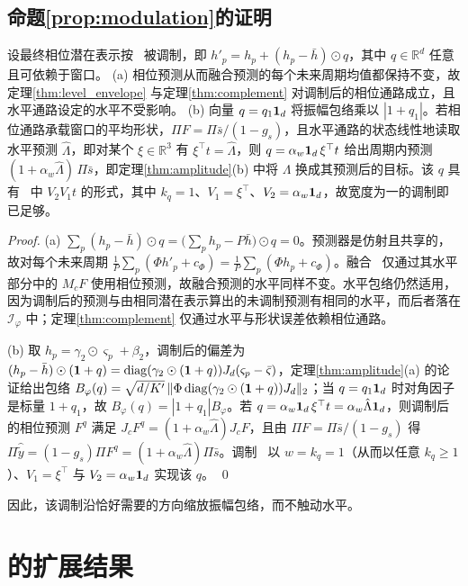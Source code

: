 {\subsection{命题\ref{prop:modulation}的证明}

 设最终相位潜在表示按~ 被调制，即 $h'_p=h_p+(h_p-\bar h)\odot q$，其中 $q\in\mathbb R^d$ 任意且可依赖于窗口。
(a) 相位预测从而融合预测的每个未来周期均值都保持不变，故定理\ref{thm:level_envelope} 与定理\ref{thm:complement} 对调制后的相位通路成立，且水平通路设定的水平不受影响。
(b) 向量 $q=q_1\mathbf 1_d$ 将振幅包络乘以 $|1+q_1|$。若相位通路承载窗口的平均形状，$\Pi F=\Pi\bar s/(1-g_s)$，且水平通路的状态线性地读取水平预测 $\hat\Lambda$，即对某个 $\xi\in\mathbb R^3$ 有 $\xi^\top t=\hat\Lambda$，则 $q=\alpha_w\mathbf 1_d\,\xi^\top t$ 给出周期内预测 $(1+\alpha_w\hat\Lambda)\,\Pi\bar s$，即定理\ref{thm:amplitude}(b) 中将 $\Lambda$ 换成其预测后的目标。该 $q$ 具有~ 中 $V_2V_1t$ 的形式，其中 $k_q=1$、$V_1=\xi^\top$、$V_2=\alpha_w\mathbf 1_d$，故宽度为一的调制即已足够。

\begin{proof}
(a) $\sum_p(h_p-\bar h)\odot q=\big(\sum_ph_p-P\bar h\big)\odot q=0$。预测器是仿射且共享的，故对每个未来周期 $\tfrac1P\sum_p(\Phi h'_p+c_\Phi)=\tfrac1P\sum_p(\Phi h_p+c_\Phi)$。融合~ 仅通过其水平部分中的 $M_cF$ 使用相位预测，故融合预测的水平同样不变。水平包络仍然适用，因为调制后的预测与由相同潜在表示算出的未调制预测有相同的水平，而后者落在 $\mathcal I_\varphi$ 中；定理\ref{thm:complement} 仅通过水平与形状误差依赖相位通路。

(b) 取 $h_p=\gamma_2\odot\varsigma_p+\beta_2$，调制后的偏差为 $(h_p-\bar h)\odot(\mathbf 1+q)=\operatorname{diag}(\gamma_2\odot(\mathbf 1+q))J_d(\varsigma_p-\bar\varsigma)$，定理\ref{thm:amplitude}(a) 的论证给出包络 $B_\varphi(q)=\sqrt{d/K'}\,\|\Phi\operatorname{diag}(\gamma_2\odot(\mathbf 1+q))J_d\|_2$；当 $q=q_1\mathbf 1_d$ 时对角因子是标量 $1+q_1$，故 $B_\varphi(q)=|1+q_1|B_\varphi$。若 $q=\alpha_w\mathbf 1_d\,\xi^\top t=\alpha_w\hat\Lambda\mathbf 1_d$，则调制后的相位预测 $F^{q}$ 满足 $J_cF^{q}=(1+\alpha_w\hat\Lambda)J_cF$，且由 $\Pi F=\Pi\bar s/(1-g_s)$ 得 $\Pi\hat{\tilde y}=(1-g_s)\Pi F^{q}=(1+\alpha_w\hat\Lambda)\Pi\bar s$。调制~ 以 $w=k_q=1$（从而以任意 $k_q\ge1$）、$V_1=\xi^\top$ 与 $V_2=\alpha_w\mathbf 1_d$ 实现该 $q$。 \qed
\end{proof}

因此，该调制沿恰好需要的方向缩放振幅包络，而不触动水平。

\section{\sysplus 的扩展结果}
\label{app:ext_results}

}

